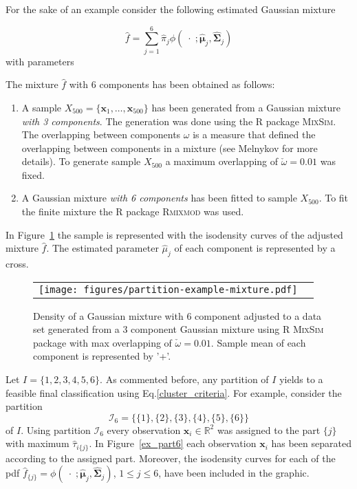 \documentclass[10pt, a4paper]{article}
\newcommand{\m}[1]{\boldsymbol{#1}}
\begin{document}
For the sake of an example consider the following estimated Gaussian mixture

\[
\hat{f} = \sum_{j=1}^6 \hat{\pi}_j \phi(\;\cdot\; ; \hat{\m\mu}_j, \hat{\m\Sigma}_j)
\]
with parameters
{\small

}

The mixture $\hat{f}$ with $6$ components has been obtained as follows:
\begin{enumerate}
\item A sample  $X_{500}=\{\m x_1, \dots, \m x_{500}\}$ has been generated from a Gaussian mixture \emph{with 3 components}. The generation was done using the R package \textsc{MixSim}. The overlapping between components $\omega$ is a measure that defined the overlapping between components in a mixture (see Melnykov for more details). To generate sample $X_{500}$ a maximum overlapping of  $\check{\omega} = 0.01$ was fixed.
\item A Gaussian mixture \emph{with 6 components} has been fitted to sample $X_{500}$. To fit the finite mixture the R package \textsc{Rmixmod} was used.
\end{enumerate}
In Figure~\ref{ex_mixture} the sample is represented with the isodensity curves of the adjusted mixture $\hat{f}$. The estimated parameter $\hat{\mu}_j$ of each component is represented by a cross.

\begin{figure}[thbp]
\begin{center}
\begin{tabular}{cc}
  \texttt{[image: figures/partition-example-mixture.pdf]} \\
 \end{tabular}
 \caption{Density of a Gaussian mixture with 6 component adjusted to a data set generated from a 3 component Gaussian mixture using R \textsc{MixSim} package with max overlapping of $\check{\omega} = 0.01$. Sample mean of each component is represented by '+'.}\label{ex_mixture}
\end{center}
\end{figure}

Let $I = \{1,2,3,4,5,6\}$. As commented before, any partition of $I$ yields to a feasible final classification using Eq.\ref{cluster_criteria}. For example, consider the partition 
\[\mathcal{I}_6 = \{\{1\},\{2\},\{3\},\{4\},\{5\},\{6\}\}\]
of $I$. Using partition $\mathcal{I}_6$ every observation $\m x_i \in \mathbb{R}^2$ was assigned to the part $\{j\}$ with maximum $\hat{\tau}_{i\{j\}}$. In Figure~\ref{ex_part6} each observation $\m x_i$ has been separated according to the assigned part. Moreover, the isodensity curves for each of the pdf $\hat{f}_{\{j\}} = \phi(\;\cdot\; ; \hat{\m\mu}_j, \hat{\m\Sigma}_j)$, $1\leq j \leq 6$, have been included in the graphic. 
\end{document}
